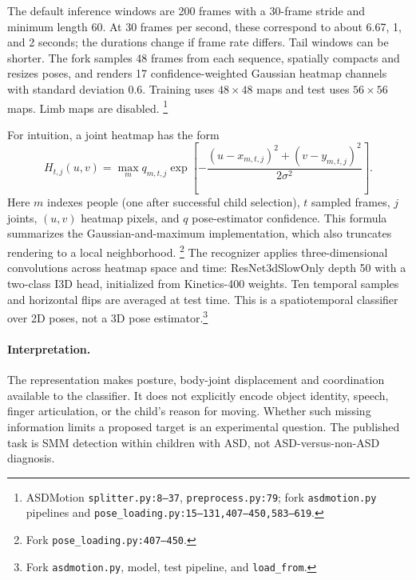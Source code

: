 The default inference windows are 200 frames with a 30-frame stride and
minimum length 60. At 30 frames per second, these correspond to about
6.67, 1, and 2 seconds; the durations change if frame rate differs.
Tail windows can be shorter. The fork samples 48 frames from each sequence,
spatially compacts and resizes poses, and renders 17 confidence-weighted
Gaussian heatmap channels with standard deviation 0.6. Training uses
$48\times48$ maps and test uses $56\times56$ maps. Limb maps are disabled.
\footnote{ASDMotion \texttt{splitter.py:8--37},
\texttt{preprocess.py:79}; fork \texttt{asdmotion.py} pipelines and
\texttt{pose\_loading.py:15--131,407--450,583--619}.}

For intuition, a joint heatmap has the form
\begin{equation}
 H_{t,j}(u,v)=\max_m q_{m,t,j}
 \exp\left[-\frac{(u-x_{m,t,j})^2+(v-y_{m,t,j})^2}{2\sigma^2}\right].
\end{equation}
Here $m$ indexes people (one after successful child selection), $t$ sampled
frames, $j$ joints, $(u,v)$ heatmap pixels, and $q$ pose-estimator confidence.
This formula summarizes the Gaussian-and-maximum implementation, which
also truncates rendering to a local neighborhood.
\footnote{Fork \texttt{pose\_loading.py:407--450}.}
The recognizer applies three-dimensional convolutions across heatmap space
and time: ResNet3dSlowOnly depth 50 with a two-class I3D head, initialized
from Kinetics-400 weights. Ten temporal samples and horizontal flips are
averaged at test time. This is a spatiotemporal classifier over 2D poses,
not a 3D pose estimator.\footnote{Fork \texttt{asdmotion.py}, model,
test pipeline, and \texttt{load\_from}.}

\paragraph{Interpretation.}
The representation makes posture, body-joint displacement and coordination
available to the classifier. It does not explicitly encode object identity,
speech, finger articulation, or the child's reason for moving. Whether
such missing information limits a proposed target is an experimental
question. The published task is SMM detection within children with ASD,
not ASD-versus-non-ASD diagnosis.\cite{barami2024}

